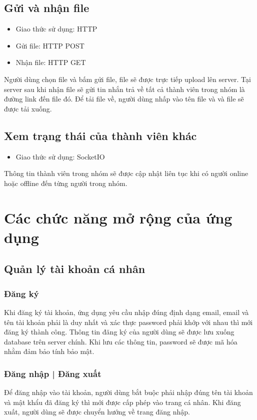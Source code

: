 \documentclass[a4paper]{article}
\begin{document}
	\subsection{Gửi và nhận file}
		\begin{itemize}
			\item Giao thức sử dụng: HTTP
			\item Gửi file: HTTP POST
			\item Nhận file: HTTP GET
		\end{itemize}
		
	Người dùng chọn file và bấm gửi file, file sẽ được trực tiếp upload lên server. Tại server sau khi nhận file sẽ gửi tin nhắn trả về tất cả thành viên trong nhóm là đường link đến file đó.\linebreak
	Để tải file về, người dùng nhấp vào tên file và và file sẽ được tải xuống.
	
	\subsection{Xem trạng thái của thành viên khác}
		\begin{itemize}
			\item Giao thức sử dụng: SocketIO
		\end{itemize}
		
	Thông tin thành viên trong nhóm sẽ được cập nhật liên tục khi có người online hoặc offline đến từng người trong nhóm.
	
\section{Các chức năng mở rộng của ứng dụng}
	\subsection{Quản lý tài khoản cá nhân}
		\subsubsection{Đăng ký}
		Khi đăng ký tài khoản, ứng dụng yêu cầu nhập đúng định dạng email, email và tên tài khoản phải là duy nhất và xác thực password phải khớp với nhau thì mới đăng ký thành công.\linebreak
		Thông tin đăng ký của người dùng sẽ được lưu xuống database trên server chính.\linebreak
		Khi lưu các thông tin, password sẽ được mã hóa nhằm đảm bảo tính bảo mật.
		
		\subsubsection{Đăng nhập | Đăng xuất}
		Để đăng nhập vào tài khoản, người dùng bắt buộc phải nhập đúng tên tài khoản và mật khẩu đã đăng ký thì mới được cấp phép vào trang cá nhân.\linebreak
		Khi đăng xuất, người dùng sẽ được chuyển hướng về trang đăng nhập.
		
\end{document}
